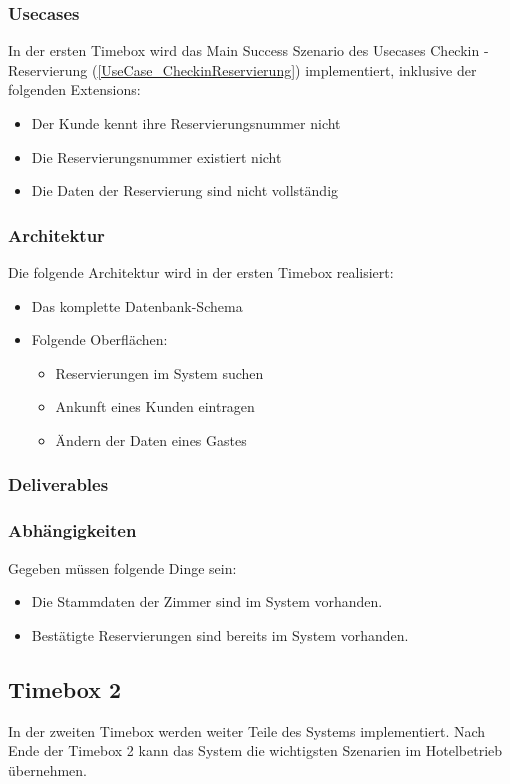 \subsubsection{Usecases}
In der ersten Timebox wird das Main Success Szenario des Usecases Checkin - Reservierung (\ref{UseCase_CheckinReservierung}) implementiert,
inklusive der folgenden Extensions:

\begin{itemize}
	\item Der \Gls{Kunde} kennt ihre \Gls{Reservierungsnummer} nicht
	\item Die \Gls{Reservierungsnummer} existiert nicht
	\item Die Daten der \Gls{Reservierung} sind nicht vollständig
\end{itemize}
\subsubsection{Architektur}
Die folgende Architektur wird in der ersten Timebox realisiert:

\begin{itemize}
	\item Das komplette Datenbank-Schema
	\item Folgende Oberflächen:
	\begin{itemize}
		\item Reservierungen im System suchen
		\item Ankunft eines \Gls{Kunde}n eintragen
		\item Ändern der Daten eines \Gls{Gast}es
	\end{itemize}
\end{itemize}
\subsubsection{Deliverables}

\subsubsection{Abhängigkeiten}
Gegeben müssen folgende Dinge sein:

\begin{itemize}
	\item Die Stammdaten der Zimmer sind im System vorhanden.
	\item Bestätigte Reservierungen sind bereits im System vorhanden.
\end{itemize}

\subsection{Timebox 2}
In der zweiten Timebox werden weiter Teile des Systems implementiert.
Nach Ende der Timebox 2 kann das System die wichtigsten Szenarien im Hotelbetrieb übernehmen.

